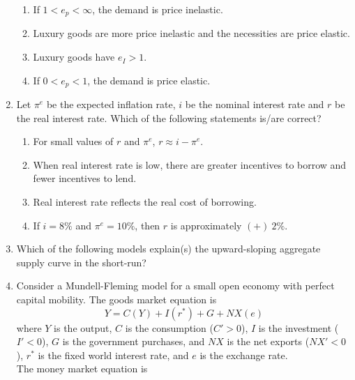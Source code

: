 \documentclass[12pt]{article}
\theoremstyle{remark}
\begin{document}
\begin{enumerate}
\begin{enumerate}
\item   If $1 < e_p < \infty$, the demand is price inelastic. 
\item   Luxury goods are more price inelastic and the necessities are price elastic. 
\item   Luxury goods have $e_I > 1$. 
\item   If $0 < e_p < 1$, the demand is price elastic. 
\end{enumerate}
\hfill{}
\item Let $\pi^e$ be the expected inflation rate, $i$ be the nominal interest rate and $r$ be the real interest rate. Which of the following statements is/are correct? 
\begin{enumerate} 
\item   For small values of $r$ and $\pi^e$, $r \approx i - \pi^e$. 
\item   When real interest rate is low, there are greater incentives to borrow and fewer incentives to lend. 
\item   Real interest rate reflects the real cost of borrowing. 
\item   If $i = 8\%$ and $\pi^e = 10\%$, then $r$ is approximately $(+)\ 2\%$. 
\end{enumerate}
\hfill{}
\item  Which of the following models explain(s) the upward-sloping aggregate supply curve in the short-run? 
\begin{enumerate}  \end{enumerate}
\hfill{}
\item   Consider a Mundell-Fleming model for a small open economy with perfect capital mobility. The goods market equation is $$Y = C(Y) + I(r^*) + G + NX(e)$$ where $Y$ is the output, $C$ is the consumption ($C' > 0$), $I$ is the investment ($I' < 0$), $G$ is the government purchases, and $NX$ is the net exports ($NX' < 0$), 
$r^*$ is the fixed world interest rate, and $e$ is the exchange rate. \\
The money market equation is \\

\end{enumerate}
\end{document}
